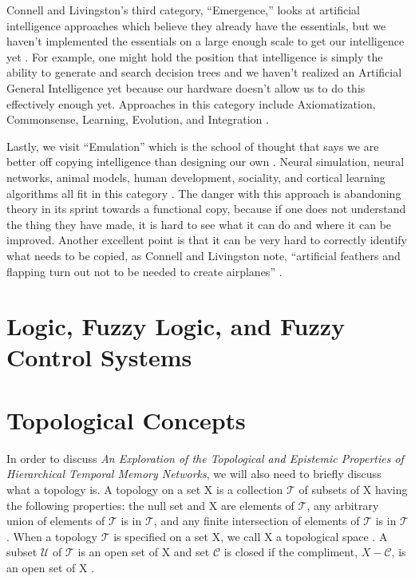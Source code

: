 \documentclass[fleqn,minimal]{article}
\newcommand\blankpage{
	\pagebreak
	\ifthispageodd{\null
		\vfill
		\vfill
		\thispagestyle{empty}
		\clearpage}{}
}
\begin{document}
	Connell and Livingston's third category, ``Emergence,'' looks at artificial intelligence approaches which believe they already have the essentials, but we haven't implemented the essentials on a large enough scale to get our intelligence yet \cite{Connell}. For example, one might hold the position that intelligence is simply the ability to generate and search decision trees and we haven't realized an Artificial General Intelligence yet because our hardware doesn't allow us to do this effectively enough yet. Approaches in this category include Axiomatization, Commonsense, Learning, Evolution, and Integration \cite{Connell}.
	
	Lastly, we visit ``Emulation'' which is the school of thought that says we are better off copying intelligence than designing our own \cite{Connell}. Neural simulation, neural networks, animal models, human development, sociality, and cortical learning algorithms all fit in this category \cite{Connell}. The danger with this approach is abandoning theory in its sprint towards a functional copy, because if one does not understand the thing they have made, it is hard to see what it can do and where it can be improved. Another excellent point is that it can be very hard to correctly identify what needs to be copied, as Connell and Livingston note, ``artificial feathers and flapping turn out not to be needed to create airplanes'' \cite{Connell}.
	
	\blankpage
	
	\section{Logic, Fuzzy Logic, and Fuzzy Control Systems}
	
	\blankpage
	\section{Topological Concepts}
	
	In order to discuss \textit{An Exploration of the Topological and Epistemic Properties of Hierarchical Temporal Memory Networks}, we will also need to briefly discuss what a topology is. A topology on a set X is a collection $\mathcal{T}$ of subsets of X having the following properties: the null set and X are elements of $\mathcal{T}$, any arbitrary union of elements of $\mathcal{T}$ is in $\mathcal{T}$, and any finite intersection of elements of $\mathcal{T}$ is in $\mathcal{T}$ \cite{Munkres}. When a topology $\mathcal{T}$ is specified on a set X, we call X a topological space \cite{Munkres}. A subset $\mathcal{U}$ of $\mathcal{T}$ is an open set of X and set $\mathcal{C}$ is closed if the compliment, $X-\mathcal{C}$, is an open set of X \cite{Adams}.
	
\end{document}
